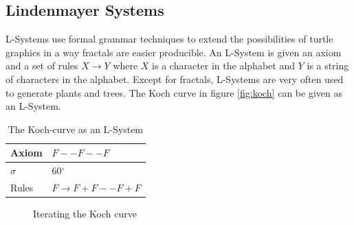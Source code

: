 \documentclass[11pt,a4paper]{article}
\newcommand{\degree}{\ensuremath{^\circ}}
\begin{document}
\subsection{Lindenmayer Systems}
L-Systems use formal grammar techniques to extend the possibilities of turtle graphics in a way fractals are easier producible. An L-System is given an axiom and a set of rules $X \rightarrow Y$ where $X$ is a character in the alphabet and $Y$ is a string of characters in the alphabet. Except for fractals, L-Systems are very often used to generate plants and trees. The Koch curve in figure \ref{fig:koch} can be given as an L-System.

\begin{table}
\center
\begin{tabular}{l l}
Axiom & $F--F--F$ \\ \hline
$\sigma$ & 60\degree \\ \hline
Rules & $F \rightarrow F+F--F+F$ \\
\end{tabular}
\caption{The Koch-curve as an L-System}
\end{table}

\begin{figure}[h]
  \centering
  \hspace{0.01\textwidth}
  \hspace{0.01\textwidth}
  \hspace{0.01\textwidth}
  \caption{Iterating the Koch curve}
  \label{fig:animals}
\end{figure}
\end{document}
